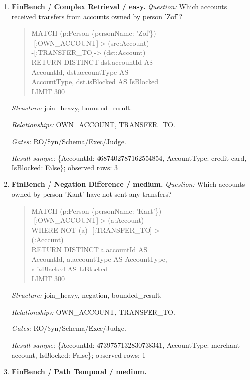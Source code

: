 \begin{enumerate}
\textit{Result sample:} \{TotalTransferredAmount: 14972318.41\}; observed rows: 1
\item \textbf{FinBench / Complex Retrieval / easy.}
\textit{Question:} Which accounts received transfers from accounts owned by person 'Zof'?
\begin{quote}\scriptsize\ttfamily\raggedright\sloppy
MATCH (p:Person \{personName: 'Zof'\})\\
-[:OWN\_ACCOUNT]-\textgreater{} (src:Account)\\
-[:TRANSFER\_TO]-\textgreater{} (dst:Account)\\
RETURN DISTINCT dst.accountId AS\\
AccountId, dst.accountType AS\\
AccountType, dst.isBlocked AS IsBlocked\\
LIMIT 300
\end{quote}
\textit{Structure:} join\_heavy, bounded\_result.\par
\textit{Relationships:} OWN\_ACCOUNT, TRANSFER\_TO.\par
\textit{Gates:} RO/Syn/Schema/Exec/Judge.\par
\textit{Result sample:} \{AccountId: 4687402787162554854, AccountType: credit card, IsBlocked: False\}; observed rows: 3
\item \textbf{FinBench / Negation Difference / medium.}
\textit{Question:} Which accounts owned by person 'Kant' have not sent any transfers?
\begin{quote}\scriptsize\ttfamily\raggedright\sloppy
MATCH (p:Person \{personName: 'Kant'\})\\
-[:OWN\_ACCOUNT]-\textgreater{} (a:Account)\\
WHERE NOT (a) -[:TRANSFER\_TO]-\textgreater{}\\
(:Account)\\
RETURN DISTINCT a.accountId AS\\
AccountId, a.accountType AS AccountType,\\
a.isBlocked AS IsBlocked\\
LIMIT 300
\end{quote}
\textit{Structure:} join\_heavy, negation, bounded\_result.\par
\textit{Relationships:} OWN\_ACCOUNT, TRANSFER\_TO.\par
\textit{Gates:} RO/Syn/Schema/Exec/Judge.\par
\textit{Result sample:} \{AccountId: 4739757132830738341, AccountType: merchant account, IsBlocked: False\}; observed rows: 1
\item \textbf{FinBench / Path Temporal / medium.}

\end{enumerate}
